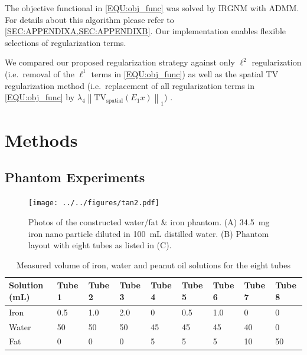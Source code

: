 \documentclass[journal,twoside,web]{ieeecolor}
\newcommand*{\norm}[1]{\left\lVert#1\right\rVert}
\begin{document}
The objective functional in \cref{EQU:obj_func} was solved by IRGNM with ADMM. 
For details about this algorithm please refer to 
\cref{SEC:APPENDIXA,SEC:APPENDIXB}. 
Our implementation enables flexible selections of regularization terms. 

We compared our proposed regularization strategy against only $\ell^2$ regularization 
(i.e.~removal of the $\ell^1$ terms in \cref{EQU:obj_func}) 
as well as the spatial TV regularization method 
(i.e.~replacement of all regularization terms in \cref{EQU:obj_func} by 
$\lambda_4 \norm{\text{TV}_\text{spatial} (E_1 x)}_1$) \cite{schneider_2020_mobawfr2s}.

\section{Methods}

\subsection{Phantom Experiments}

\begin{figure}
	\centering
	\texttt{[image: ../../figures/tan2.pdf]}
	\caption{Photos of the constructed water/fat \& iron phantom. 
			(A) 34.5~mg iron nano particle diluted in 100~mL distilled water.
			(B) Phantom layout with eight tubes as listed in (C).}
	\label{FIG:PHA_WFIRON}
\end{figure}

\begin{table}[t]
	\caption{Measured volume of iron, water and peanut oil solutions for the eight tubes}
	\setlength{\tabcolsep}{3pt}
	\begin{tabular}{m{} m{} m{} m{} m{} m{} m{} m{} m{}}
			\toprule
			Solution (\si{\milli\liter}) & Tube 1 & Tube 2 & Tube 3 & Tube 4 & Tube 5 & Tube 6 & Tube 7 & Tube 8 \\
			\hline
			Iron  &  0.5 &  1.0 &  2.0 &  0 &  0.5 &  1.0 &  0 &  0 \\
			Water & 50   & 50   & 50   & 45 & 45   & 45   & 40 &  0 \\
			Fat   &  0   &  0   &  0   &  5 &  5   &  5   & 10 & 50 \\
			\bottomrule
		\end{tabular}
	\label{TAB:PHA}
\end{table}
\end{document}
